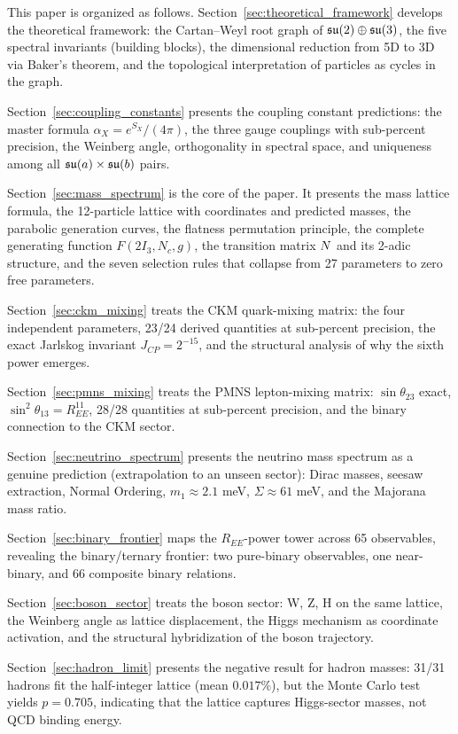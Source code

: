 This paper is organized as follows. Section~\ref{sec:theoretical_framework} develops the theoretical framework: the Cartan--Weyl root graph of $\mathfrak{su}(2) \oplus \mathfrak{su}(3)$, the five spectral invariants (building blocks), the dimensional reduction from 5D to 3D via Baker's theorem, and the topological interpretation of particles as cycles in the graph.

Section~\ref{sec:coupling_constants} presents the coupling constant predictions: the master formula $\alpha_X = e^{S_X}/(4\pi)$, the three gauge couplings with sub-percent precision, the Weinberg angle, orthogonality in spectral space, and uniqueness among all $\mathfrak{su}(a) \times \mathfrak{su}(b)$ pairs.

Section~\ref{sec:mass_spectrum} is the core of the paper. It presents the mass lattice formula, the 12-particle lattice with coordinates and predicted masses, the parabolic generation curves, the flatness permutation principle, the complete generating function $F(2I_3, N_c, g)$, the transition matrix $N$ and its 2-adic structure, and the seven selection rules that collapse from 27 parameters to zero free parameters.

Section~\ref{sec:ckm_mixing} treats the CKM quark-mixing matrix: the four independent parameters, 23/24 derived quantities at sub-percent precision, the exact Jarlskog invariant $J_{CP} = 2^{-15}$, and the structural analysis of why the sixth power emerges.

Section~\ref{sec:pmns_mixing} treats the PMNS lepton-mixing matrix: $\sin\theta_{23}$ exact, $\sin^2\theta_{13} = R_{EE}^{11}$, 28/28 quantities at sub-percent precision, and the binary connection to the CKM sector.

Section~\ref{sec:neutrino_spectrum} presents the neutrino mass spectrum as a genuine prediction (extrapolation to an unseen sector): Dirac masses, seesaw extraction, Normal Ordering, $m_1 \approx 2.1$ meV, $\Sigma \approx 61$ meV, and the Majorana mass ratio.

Section~\ref{sec:binary_frontier} maps the $R_{EE}$-power tower across 65 observables, revealing the binary/ternary frontier: two pure-binary observables, one near-binary, and 66 composite binary relations.

Section~\ref{sec:boson_sector} treats the boson sector: W, Z, H on the same lattice, the Weinberg angle as lattice displacement, the Higgs mechanism as coordinate activation, and the structural hybridization of the boson trajectory.

Section~\ref{sec:hadron_limit} presents the negative result for hadron masses: 31/31 hadrons fit the half-integer lattice (mean $0.017\%$), but the Monte Carlo test yields $p = 0.705$, indicating that the lattice captures Higgs-sector masses, not QCD binding energy.

